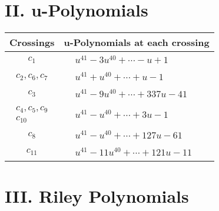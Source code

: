 \documentclass[1p]{elsarticle_modified}
\theoremstyle{definition}
\begin{document}
\newpage\renewcommand{\arraystretch}{1}
\centering \section*{ II. u-Polynomials}
\begin{tabular}{m{50pt}|m{274pt}}
Crossings & \hspace{64pt}u-Polynomials at each crossing \\
\hline $$\begin{aligned}c_{1}\end{aligned}$$&$\begin{aligned}
&u^{41}-3 u^{40}+\cdots- u+1
\end{aligned}$\\
\hline $$\begin{aligned}c_{2},c_{6},c_{7}\end{aligned}$$&$\begin{aligned}
&u^{41}+u^{40}+\cdots+u-1
\end{aligned}$\\
\hline $$\begin{aligned}c_{3}\end{aligned}$$&$\begin{aligned}
&u^{41}-9 u^{40}+\cdots+337 u-41
\end{aligned}$\\
\hline $$\begin{aligned}c_{4},c_{5},c_{9}\\c_{10}\end{aligned}$$&$\begin{aligned}
&u^{41}- u^{40}+\cdots+3 u-1
\end{aligned}$\\
\hline $$\begin{aligned}c_{8}\end{aligned}$$&$\begin{aligned}
&u^{41}- u^{40}+\cdots+127 u-61
\end{aligned}$\\
\hline $$\begin{aligned}c_{11}\end{aligned}$$&$\begin{aligned}
&u^{41}-11 u^{40}+\cdots+121 u-11
\end{aligned}$\\
\hline
\end{tabular}\newpage\renewcommand{\arraystretch}{1}
\centering \section*{ III. Riley Polynomials}
\end{document}

